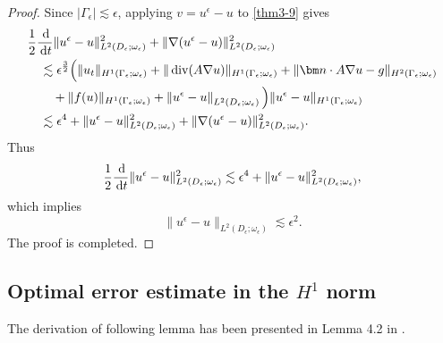 \documentclass[3p,times]{elsarticle}
\numberwithin{equation}{section}
\newcommand{\dd}{\,{\rm d}}
\newcommand{\divo}{\,{\rm div}}
\begin{document}
\begin{proof}
	Since $|\Gamma_{\epsilon}|\lesssim \epsilon$, applying $v=u^{\epsilon}-u$ to \eqref{thm3-9} gives
	\begin{equation}
		\begin{aligned}
			\label{thm3-11}
			&\frac 1 2\frac{\dd}{\dd t}\|u^{\epsilon}-u\|_{L^2(D_{\epsilon};\omega_{\epsilon})}^2+\|\nabla(u^{\epsilon}-u)\|_{L^2(D_{\epsilon};\omega_{\epsilon})}^2\\
			&\quad\lesssim \epsilon^{\frac 3 2}\Big(\|u_t\|_{H^1(\Gamma_{\epsilon};\omega_{\epsilon})}+\|\divo(A\nabla u)\|_{H^1(\Gamma_{\epsilon};\omega_{\epsilon})}+\|\bm n\cdot A\nabla u-g\|_{H^2(\Gamma_{\epsilon};\omega_{\epsilon})}\\
			&\qquad+\|f(u)\|_{H^1(\Gamma_{\epsilon};\omega_{\epsilon})}+\left\|u^{\epsilon}-u\right\|_{L^2(D_{\epsilon};\omega_{\epsilon})}\Big)\|u^{\epsilon}-u\|_{H^1(\Gamma_{\epsilon};\omega_{\epsilon})}\\
			&\quad\lesssim  \epsilon^4 +\|u^{\epsilon}-u\|_{L^2(D_{\epsilon};\omega_{\epsilon})}^2+\|\nabla(u^{\epsilon}-u)\|_{L^2(D_{\epsilon};\omega_{\epsilon})}^2.
		\end{aligned}
	\end{equation}
	Thus
	\begin{equation*}
		\frac 1 2\frac{\dd}{\dd t}\|u^{\epsilon}-u\|_{L^2(D_{\epsilon};\omega_{\epsilon})}^2 \lesssim \epsilon^4+\|u^{\epsilon}-u\|_{L^2(D_{\epsilon};\omega_{\epsilon})}^2,
	\end{equation*}
	which implies 
	\begin{equation*}
		\|u^{\epsilon}-u\|_{L^2(D_{\epsilon};\omega_{\epsilon})}\lesssim \epsilon^2.
	\end{equation*}
	The proof is completed.
	
\end{proof}


\subsection{Optimal error estimate in the $H^1$ norm}

The derivation of following lemma has been presented in Lemma 4.2 in \cite{HaoJu2025}.
\end{document}
